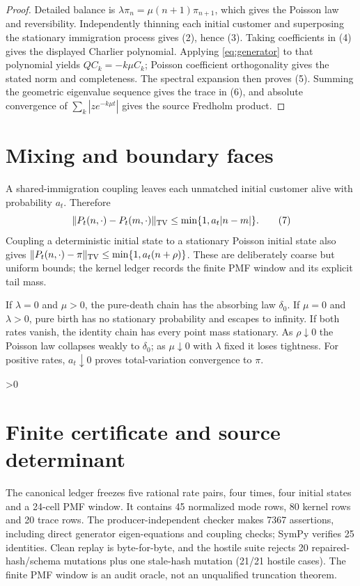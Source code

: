 \documentclass[11pt]{article}
\begin{document}
\begin{proof}
Detailed balance is $\lambda\pi_n=\mu(n+1)\pi_{n+1}$, which gives the
Poisson law and reversibility.  Independently thinning each initial customer
and superposing the stationary immigration process gives (2), hence (3).
Taking coefficients in (4) gives the displayed Charlier polynomial.  Applying
\eqref{eq:generator} to that polynomial yields $QC_k=-k\mu C_k$; Poisson
coefficient orthogonality gives the stated norm and completeness.  The spectral
expansion then proves (5).  Summing the geometric eigenvalue sequence gives
the trace in (6), and absolute convergence of $\sum_k|ze^{-k\mu t}|$ gives
the source Fredholm product.
\end{proof}

\section{Mixing and boundary faces}
A shared-immigration coupling leaves each unmatched initial customer alive
with probability $a_t$.  Therefore
\begin{equation}
 \|P_t(n,\cdot)-P_t(m,\cdot)\|_{\rm TV}
 \le \min\{1,a_t|n-m|\}. \tag{7}
\end{equation}
Coupling a deterministic initial state to a stationary Poisson initial state
also gives $\|P_t(n,\cdot)-\pi\|_{\rm TV}\le
\min\{1,a_t(n+\rho)\}$.  These are deliberately coarse but uniform bounds;
the kernel ledger records the finite PMF window and its explicit tail mass.

If $\lambda=0$ and $\mu>0$, the pure-death chain has the absorbing law
$\delta_0$.  If $\mu=0$ and $\lambda>0$, pure birth has no stationary
probability and escapes to infinity.  If both rates vanish, the identity
chain has every point mass stationary.  As $\rho\downarrow0$ the Poisson law
collapses weakly to $\delta_0$; as $\mu\downarrow0$ with $\lambda$ fixed it
loses tightness.  For positive rates, $a_t\downarrow0$ proves total-variation
convergence to $\pi$.

\ifnum\CRevisionRound>0
\section{Finite certificate and source determinant}
The canonical ledger freezes five rational rate pairs, four times, four initial
states and a 24-cell PMF window.  It contains 45 normalized mode rows, 80
kernel rows and 20 trace rows.  The producer-independent checker makes 7367
assertions, including direct generator eigen-equations and coupling checks;
SymPy verifies 25 identities.  Clean replay is byte-for-byte, and the hostile
suite rejects 20 repaired-hash/schema mutations plus one stale-hash mutation
(21/21 hostile cases).
The finite PMF window is an audit oracle, not an unqualified truncation theorem.
\fi
\end{document}
